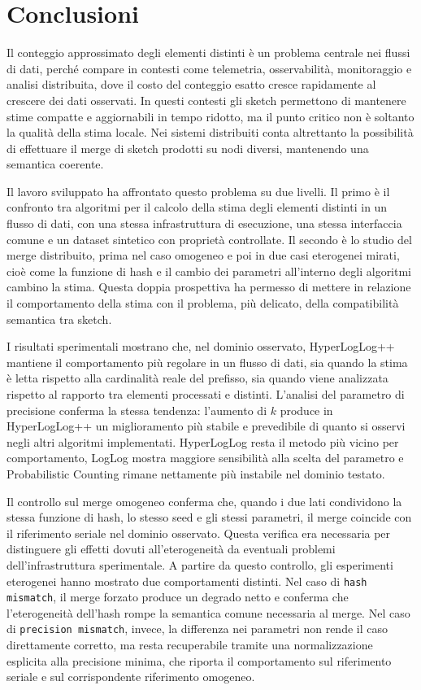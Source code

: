 \chapter{Conclusioni}
\label{chp:conclusioni}

Il conteggio approssimato degli elementi distinti è un problema centrale nei
flussi di dati, perché compare in contesti come telemetria, osservabilità,
monitoraggio e analisi distribuita, dove il costo del conteggio esatto cresce
rapidamente al crescere dei dati osservati. In questi contesti gli sketch
permettono di mantenere stime compatte e aggiornabili in tempo
ridotto, ma il punto critico non è soltanto la qualità della stima locale. Nei
sistemi distribuiti conta altrettanto la possibilità di effettuare il merge di
sketch prodotti su nodi diversi, mantenendo una semantica coerente.

Il lavoro sviluppato ha affrontato questo problema su due livelli. Il primo è
il confronto tra algoritmi per il calcolo della stima degli elementi distinti in
un flusso di dati, con una stessa infrastruttura di esecuzione, una stessa
interfaccia comune e un dataset sintetico con proprietà controllate. 
Il secondo
è lo studio del merge distribuito, prima nel caso omogeneo e poi in due casi
eterogenei mirati, cioè come la funzione di hash e il
cambio dei parametri all'interno degli algoritmi cambino la stima. 
Questa doppia prospettiva ha permesso di
mettere in relazione il comportamento della stima con il problema, più delicato,
della compatibilità semantica tra sketch.

I risultati sperimentali mostrano che, nel dominio osservato, HyperLogLog++
mantiene il comportamento più regolare in un flusso di dati, sia quando la
stima è letta rispetto alla cardinalità reale del prefisso, sia quando viene
analizzata rispetto al rapporto tra elementi processati e distinti. L'analisi
del parametro di precisione conferma la stessa tendenza: l'aumento di \(k\)
produce in HyperLogLog++ un miglioramento più stabile e prevedibile di quanto si
osservi negli altri algoritmi implementati. HyperLogLog resta il metodo più
vicino per comportamento, LogLog mostra maggiore sensibilità alla scelta del
parametro e Probabilistic Counting rimane nettamente più instabile nel dominio
testato.

Il controllo sul merge omogeneo conferma che, quando i due lati condividono la
stessa funzione di hash, lo stesso seed e gli stessi parametri, il merge
coincide con il riferimento seriale nel dominio osservato. Questa verifica era
necessaria per distinguere gli effetti dovuti all'eterogeneità da eventuali
problemi dell'infrastruttura sperimentale. A partire da questo controllo, gli
esperimenti eterogenei hanno mostrato due comportamenti distinti. Nel caso di
\texttt{hash mismatch}, il merge forzato produce un degrado netto e conferma
che l'eterogeneità dell'hash rompe la semantica comune necessaria al merge. Nel
caso di \texttt{precision mismatch}, invece, la differenza nei parametri non rende il
caso direttamente corretto, ma resta recuperabile tramite una normalizzazione
esplicita alla precisione minima, che riporta il comportamento sul riferimento
seriale e sul corrispondente riferimento omogeneo.


